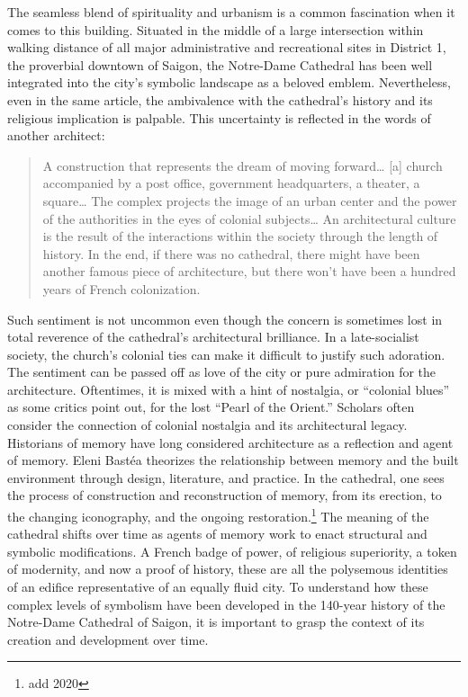 The seamless blend of spirituality and urbanism is a common fascination when it comes to this building. Situated in the middle of a large intersection within walking distance of all major administrative and recreational sites in District 1, the proverbial downtown of Saigon, the Notre-Dame Cathedral has been well integrated into the city’s symbolic landscape as a beloved emblem. Nevertheless, even in the same article, the ambivalence with the cathedral’s history and its religious implication is palpable. This uncertainty is reflected in the words of another architect:

\begin{quotation}
A construction that represents the dream of moving forward… [a] church accompanied by a post office, government headquarters, a theater, a square… The complex projects the image of an urban center and the power of the authorities in the eyes of colonial subjects… An architectural culture is the result of the interactions within the society through the length of history. In the end, if there was no cathedral, there might have been another famous piece of architecture, but there won’t have been a hundred years of French colonization.
\end{quotation}

Such sentiment is not uncommon even though the concern is sometimes lost in total reverence of the cathedral’s architectural brilliance. In a late-socialist society, the church’s colonial ties can make it difficult to justify such adoration. The sentiment can be passed off as love of the city or pure admiration for the architecture. Oftentimes, it is mixed with a hint of nostalgia, or “colonial blues” as some critics point out, for the lost “Pearl of the Orient.” Scholars often consider the connection of colonial nostalgia and its architectural legacy. Historians of memory have long considered architecture as a reflection and agent of memory. Eleni Bastéa theorizes the relationship between memory and the built environment through design, literature, and practice.  In the cathedral, one sees the process of construction and reconstruction of memory, from its erection, to the changing iconography, and the ongoing restoration.\footnote{add 2020} The meaning of the cathedral shifts over time as agents of memory work to enact structural and symbolic modifications. A French badge of power, of religious superiority, a token of modernity, and now a proof of history, these are all the polysemous identities of an edifice representative of an equally fluid city. To understand how these complex levels of symbolism have been developed in the 140-year history of the Notre-Dame Cathedral of Saigon, it is important to grasp the context of its creation and development over time. \en

